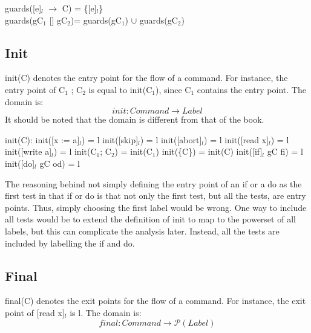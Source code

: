 \docpar
guards([e]$_l$ $\to$ C)      = \{[e]$_l$\}\\
guards(gC$_1$ [] gC$_2$)= guards(gC$_1$) $\cup$ guards(gC$_2$)\\

\subsection{Init}
init(C) denotes the entry point for the flow of a command.
For instance, the entry point of C$_1$ ; C$_2$ is equal to init(C$_1$),
since C$_1$ contains the entry point. The domain is:
\[init \colon Command \to Label\]
It should be noted that the domain is different from that of the book.

init(C):\newline
init([x := a]$_l$)      = l\newline
init([skip]$_l$)        = l\newline
init([abort]$_l$)       = l\newline
init([read x]$_l$)      = l\newline
init([write a]$_l$)     = l\newline
init(C$_1$; C$_2$)        = init(C$_1$)\newline
init(\{C\})             = init(C)\newline
init([if]$_l$ gC fi)        = l\newline
init([do]$_l$ gC od)        = l\newline

\docpar
The reasoning behind not simply defining the entry point of an if or a do as the first
test in that if or do is that not only the first test, but all the tests, are entry points.
Thus, simply choosing the first label would be wrong. One way to include all tests would
be to extend the definition of init to map to the powerset of all labels, but this
can complicate the analysis later. Instead, all the tests are included by labelling
the if and do.



\subsection{Final}
final(C) denotes the exit points for the flow of a command.
For instance, the exit point of [read x]$_l$ is l. The domain is:
\[final \colon Command \to \mathcal{P}(Label)\]


